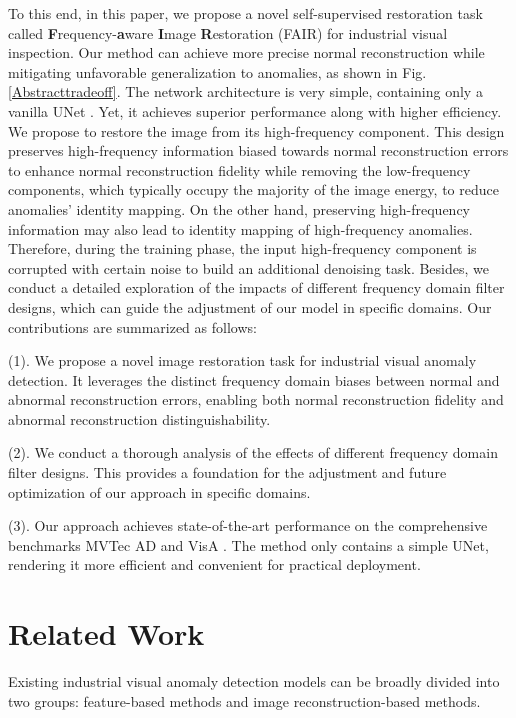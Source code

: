 \documentclass[5p, twocolumn]{elsarticle}[draft]
\begin{document}
To this end, in this paper, we propose a novel self-supervised restoration task called \textbf{F}requency-\textbf{a}ware \textbf{I}mage \textbf{R}estoration (FAIR) for industrial visual inspection. Our method can achieve more precise normal reconstruction while mitigating unfavorable generalization to anomalies, as shown in Fig. \ref{Abstracttradeoff}. The network architecture is very simple, containing only a vanilla UNet \cite{ronneberger2015u}. Yet, it achieves superior performance along with higher efficiency. We propose to restore the image from its high-frequency component. This design preserves high-frequency information biased towards normal reconstruction errors to enhance normal reconstruction fidelity while removing the low-frequency components, which typically occupy the majority of the image energy, to reduce anomalies' identity mapping. On the other hand, preserving high-frequency information may also lead to identity mapping of high-frequency anomalies. Therefore, during the training phase, the input high-frequency component is corrupted with certain noise to build an additional denoising task. Besides, we conduct a detailed exploration of the impacts of different frequency domain filter designs, which can guide the adjustment of our model in specific domains. Our contributions are summarized as follows: 

(1). We propose a novel image restoration task for industrial visual anomaly detection. It leverages the distinct frequency domain biases between normal and abnormal reconstruction errors, enabling both normal reconstruction fidelity and abnormal reconstruction distinguishability.

(2). We conduct a thorough analysis of the effects of different frequency domain filter designs. This provides a foundation for the adjustment and future optimization of our approach in specific domains.

(3). Our approach achieves state-of-the-art performance on the comprehensive benchmarks MVTec AD \cite{bergmann2019mvtec} and VisA \cite{zou2022spot}. The method only contains a simple UNet, rendering it more efficient and convenient for practical deployment.


\section{Related Work}
\label{20}
Existing industrial visual anomaly detection models can be broadly divided into two groups: feature-based methods and image reconstruction-based methods.
\end{document}
